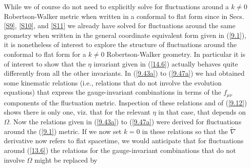 \documentclass[aps,onecolumn,10pt]{revtex4}
\numberwithin{equation}{section}
\numberwithin{equation}{section}
\begin{document}
While we of course do not need to explicitly solve for fluctuations around a $k\neq 0$ Robertson-Walker metric when written in a conformal to flat form since in Secs. \ref{S9}, \ref{S10}, and \ref{S11} we already have solved for fluctuations around the same geometry when written in the general coordinate equivalent form given in (\ref{9.1}), it is nonetheless of interest to explore the structure of fluctuations around the conformal to flat form for a $k\neq 0$ Robertson-Walker geometry. In particular it is of interest to show that the $\eta$ invariant given in (\ref{14.6}) actually behaves quite differently from all the other invariants.   In (\ref{9.43a}) to (\ref{9.47a}) we had obtained some kinematic relations (i.e., relations that do not involve the evolution equations) that express the gauge-invariant combinations in terms of the  $f_{\mu\nu}$ components of the fluctuation metric. Inspection of these relations and of (\ref{9.12}) shows there is  only one, viz. that for the relevant $\eta$ in that case, that depends on $\Omega$. Now the relations given  in (\ref{9.43a}) to (\ref{9.47a}) were derived for fluctuations around the (\ref{9.1}) metric. If we now set $k=0$ in these relations so that the $\tilde{\nabla}$ derivative now refers to flat spacetime, we would anticipate that for fluctuations around (\ref{13.6}) the relations for the gauge-invariant combinations that do not involve $\Omega$ might be replaced by 
\end{document}
